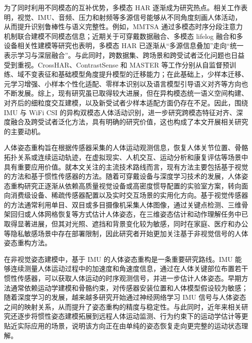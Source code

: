 为了同时利用不同模态的互补优势，多模态 HAR 逐渐成为研究热点。相关工作表明，视觉、IMU、音频、压力和射频等多源信号能够从不同角度刻画人体活动，从而提升识别鲁棒性与语义完整性。例如，MMTSA 通过多模态时序分段注意力机制联合建模不同模态信息；近期关于可穿戴数据融合、多模态 lifelog 融合和多设备相关性建模等研究也表明，多模态 HAR 已逐渐从“多源信息叠加”走向“统一表示学习与深层融合”\cite{gao2023mmtsa,celik2023bringing,oh2024multi,khan2025encoding,ahmad2024hyperhar}。与此同时，跨数据集、跨场景和跨受试者泛化问题也日益受到重视。CrossHAR、ContrastSense 和 MASTER 等工作分别从自监督预训练、域不变表征和基础模型角度提升模型的迁移能力\cite{hong2024crosshar,dai2024contrastsense,zhu2025master}；在此基础上，少样本迁移、元学习增强、小样本个性化适配、零样本识别以及语言模型引导语义对齐等方向也不断发展\cite{ganesha2024few,vettoruzzo2025efficient,jia2024holistic,su2025imuzero,xue2025mobhar,yan2025large}。综上，现有研究虽已取得较大进展，但在异构模态统一语义空间构建、对齐后的细粒度交互建模，以及新受试者少样本适配方面仍存在不足。因此，围绕 IMU 与 WiFi CSI 的异构双模态人体活动识别，进一步研究跨模态特征对齐、深度融合及跨受试者泛化方法，具有明确的研究价值，这也构成了本文开展相关研究的主要动机。


人体姿态重构旨在根据传感器采集的人体运动观测信息，恢复人体关节位置、骨骼拓扑关系或连续运动轨迹，在虚拟现实、人机交互、运动分析和康复评估等场景中具有重要应用价值。就本文关注的主流技术路线而言，现有方法主要包括基于视觉的方法和基于惯性传感器的方法。随着可穿戴设备与深度学习技术的发展，人体姿态重构研究正逐渐从依赖高质量视觉设备或高密度惯导配置的实验室方案，转向面向消费级设备、稀疏传感器配置以及实时交互场景的实用化方向。基于视觉传感器的方法通常利用单目、双目或多目摄像机采集人体图像，通过关键点检测、三维骨架回归或人体网格恢复等方式估计人体姿态，在三维姿态估计和动作理解任务中已取得显著进展，但其对光照、遮挡和背景变化较为敏感，同时在家庭、医疗和办公等隐私敏感场景中存在部署限制，因此研究者开始更加关注基于非视觉信号的人体姿态重构方法。

在非视觉姿态建模中，基于 IMU 的人体姿态重构是一条重要研究路线。IMU 能够连续测量人体运动过程中的加速度和角速度信息，通过在人体关键部位布置若干惯性传感器，可以获取人体运动的时序观测信号，并进一步估计人体姿态。早期方法通常依赖运动学建模和骨骼约束，对传感器安装位置和人体模型假设较为敏感；随着深度学习的发展，越来越多研究开始通过神经网络学习 IMU 信号与人体姿态之间的映射关系，从而提升了姿态重构的精度与稳定性\cite{yi2022physical,jiang2022transformer}。与此同时，近年来相关研究还逐步将惯性姿态建模拓展到远程人体运动监测、行为约束下的运动学估计等更贴近实际应用的场景，说明该方向正在由单纯的姿态恢复走向更完整的运动状态理解\cite{giessler2024wearable,kim2025learning,yang2024parallel}。

